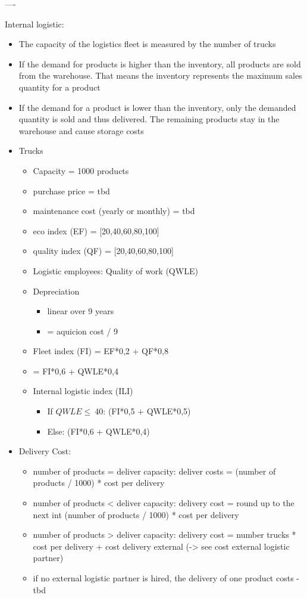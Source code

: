 ----

Internal logistic:
\begin{itemize}
    \item The capacity of the logistics fleet is measured by the number of trucks
    \item If the demand for products is higher than the inventory, all products are sold from the warehouse. That means the inventory represents the maximum sales quantity for a product
    \item If the demand for a product is lower than the inventory, only the demanded quantity is sold and thus delivered. The remaining products stay in the warehouse and cause storage costs 
    \item Trucks
    \begin{itemize}
        \item Capacity = 1000 products  
        \item purchase price = tbd 
        \item maintenance cost (yearly or monthly) = tbd
        \item eco index (EF) = [20,40,60,80,100]
        \item quality index (QF) = [20,40,60,80,100]
        \item Logistic employees: Quality of work (QWLE)
        \item Depreciation 
        \begin{itemize}
            \item linear over 9 years
            \item = aquicion cost / 9 
        \end{itemize}
        \item Fleet index (FI) = EF*0,2 + QF*0,8
        \item  = FI*0,6 + QWLE*0,4
        \item Internal logistic index (ILI)
        \begin{itemize}
            \item If $QWLE \leq \ $40: (FI*0,5 + QWLE*0,5)
            \item Else: (FI*0,6 + QWLE*0,4)
        \end{itemize}
    \end{itemize}
    \item Delivery Cost:
    \begin{itemize}
        \item number of products = deliver capacity: deliver costs  = (number of products / 1000) * cost per delivery
        \item number of products < deliver capacity: delivery cost = round up to the next int (number of products / 1000) * cost per delivery
        \item number of products > deliver capacity: delivery cost = number trucks * cost per delivery + cost delivery external (-> see cost external logistic partner) 
        \item if no external logistic partner is hired, the delivery of one product costs -tbd
    \end{itemize}
\end{itemize}

